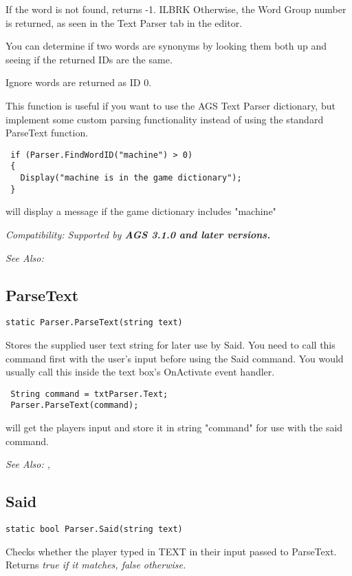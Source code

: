 If the word is not found, returns -1. ILBRK
Otherwise, the Word Group number is returned, as seen in the Text Parser tab in the editor.

You can determine if two words are synonyms by looking them both up and seeing if the
returned IDs are the same.

Ignore words are returned as ID 0.

This function is useful if you want to use the AGS Text Parser dictionary, but implement
some custom parsing functionality instead of using the standard ParseText function.

\begin{verbatim}
 if (Parser.FindWordID("machine") > 0)
 {
   Display("machine is in the game dictionary");
 }
\end{verbatim}
will display a message if the game dictionary includes "machine"

\it{Compatibility:} Supported by \bf{AGS 3.1.0} and later versions.

\it{See Also:} 


\subsection{ParseText}\label{Parser.ParseText}%

\begin{verbatim}
static Parser.ParseText(string text)
\end{verbatim}
Stores the supplied user text string for later use by Said.
You need to call this command first with the user's input before using
the Said command. You would usually call this inside the text box's
OnActivate event handler.

\begin{verbatim}
 String command = txtParser.Text;
 Parser.ParseText(command);
\end{verbatim}
will get the players input and store it in string "command" for use with the said command.

\it{See Also:} ,


\subsection{Said}\label{Parser.Said}%

\begin{verbatim}
static bool Parser.Said(string text)
\end{verbatim}
Checks whether the player typed in TEXT in their input passed to ParseText.
Returns \it{true} if it matches, \it{false} otherwise.

